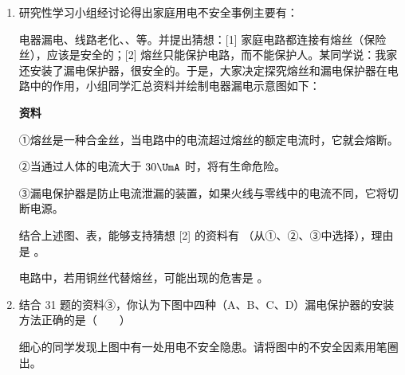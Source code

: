 \documentclass[\gkver]{gaokaozhenti}
\begin{document}
\begin{enumerate}

{②}
{③}
{④}


\item
研究性学习小组经讨论得出家庭用电不安全事例主要有：

电器漏电、线路老化、、等。并提出猜想：[1] 家庭电路都连接有熔丝（保险丝），应该是安全的；[2] 熔丝只能保护电路，而不能保护人。某同学说：我家还安装了漏电保护器，很安全的。于是，大家决定探究熔丝和漏电保护器在电路中的作用，小组同学汇总资料并绘制电器漏电示意图如下：

\textbf{资料}

①熔丝是一种合金丝，当电路中的电流超过熔丝的额定电流时，它就会熔断。

②当通过人体的电流大于 $30\UmA$ 时，将有生命危险。

③漏电保护器是防止电流泄漏的装置，如果火线与零线中的电流不同，它将切断电源。

结合上述图、表，能够支持猜想 [2] 的资料有 （从①、②、③中选择），理由是 。

电路中，若用铜丝代替熔丝，可能出现的危害是 。




\item
结合 31 题的资料③，你认为下图中四种（A、B、C、D）漏电保护器的安装方法正确的是（　　）

细心的同学发现上图中有一处用电不安全隐患。请将图中的不安全因素用笔圈出。



\end{enumerate}
\end{document}
